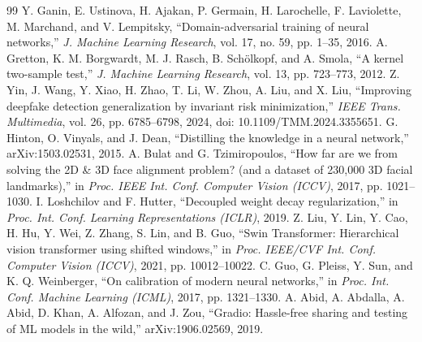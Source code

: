 \begin{thebibliography}{99}
 Y. Ganin, E. Ustinova, H. Ajakan, P. Germain, H. Larochelle, F. Laviolette, M. Marchand, and V. Lempitsky, ``Domain-adversarial training of neural networks,'' \emph{J. Machine Learning Research}, vol. 17, no. 59, pp. 1--35, 2016.
 A. Gretton, K. M. Borgwardt, M. J. Rasch, B. Schölkopf, and A. Smola, ``A kernel two-sample test,'' \emph{J. Machine Learning Research}, vol. 13, pp. 723--773, 2012.
 Z. Yin, J. Wang, Y. Xiao, H. Zhao, T. Li, W. Zhou, A. Liu, and X. Liu, ``Improving deepfake detection generalization by invariant risk minimization,'' \emph{IEEE Trans. Multimedia}, vol. 26, pp. 6785--6798, 2024, doi: 10.1109/TMM.2024.3355651.
 G. Hinton, O. Vinyals, and J. Dean, ``Distilling the knowledge in a neural network,'' arXiv:1503.02531, 2015.
 A. Bulat and G. Tzimiropoulos, ``How far are we from solving the 2D \& 3D face alignment problem? (and a dataset of 230,000 3D facial landmarks),'' in \emph{Proc. IEEE Int. Conf. Computer Vision (ICCV)}, 2017, pp. 1021--1030.
 I. Loshchilov and F. Hutter, ``Decoupled weight decay regularization,'' in \emph{Proc. Int. Conf. Learning Representations (ICLR)}, 2019.
 Z. Liu, Y. Lin, Y. Cao, H. Hu, Y. Wei, Z. Zhang, S. Lin, and B. Guo, ``Swin Transformer: Hierarchical vision transformer using shifted windows,'' in \emph{Proc. IEEE/CVF Int. Conf. Computer Vision (ICCV)}, 2021, pp. 10012--10022.
 C. Guo, G. Pleiss, Y. Sun, and K. Q. Weinberger, ``On calibration of modern neural networks,'' in \emph{Proc. Int. Conf. Machine Learning (ICML)}, 2017, pp. 1321--1330.
 A. Abid, A. Abdalla, A. Abid, D. Khan, A. Alfozan, and J. Zou, ``Gradio: Hassle-free sharing and testing of ML models in the wild,'' arXiv:1906.02569, 2019.
\end{thebibliography}

